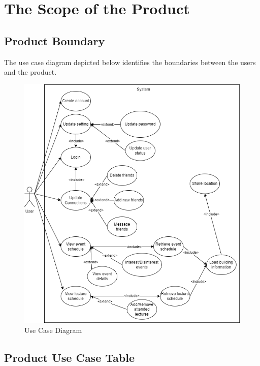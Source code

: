 \documentclass[12pt]{article}
\begin{document}
\section{The Scope of the Product}
\subsection{Product Boundary}

The use case diagram depicted below identifies the boundaries between the users and the product.
\begin{figure}[H]
\begin{center}
\includegraphics[scale=0.5]{Use_Case_Diagram.png}
\end{center}
\caption{Use Case Diagram}
\end{figure}

\subsection{Product Use Case Table}
\end{document}
